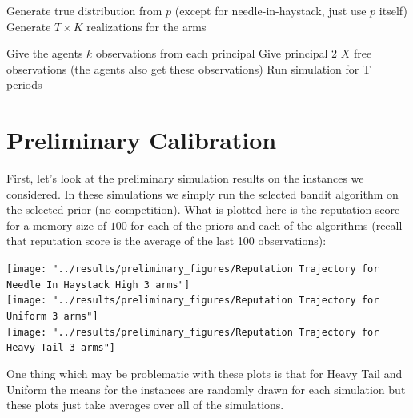 \documentclass[11pt,letterpaper]{article}
\begin{document}
\begin{algorithm}
\begin{algorithmic}[1]
\State Generate true distribution from $p$ (except for needle-in-haystack, just use $p$ itself)
\State Generate $T \times K$ realizations for the arms 
				
				\State Give the agents $k$ observations from each principal
				\State Give principal 2 $X$ free observations (the agents also get these observations)
				\State Run simulation for T periods
			\EndFor
		\EndFor
	\EndFor
\EndFor
\end{algorithmic}
\end{algorithm}

\section*{Preliminary Calibration}

First, let's look at the preliminary simulation results on the instances we considered. In these simulations we simply run the selected bandit algorithm on the selected prior (no competition).  What is plotted here is the reputation score for a memory size of $100$ for each of the priors and each of the algorithms (recall that reputation score is the average of the last 100 observations):

\texttt{[image: "../results/preliminary\_figures/Reputation Trajectory for Needle In Haystack High 3 arms"]} \\
\texttt{[image: "../results/preliminary\_figures/Reputation Trajectory for Uniform 3 arms"]} \\
\texttt{[image: "../results/preliminary\_figures/Reputation Trajectory for Heavy Tail 3 arms"]}

One thing which may be problematic with these plots is that for Heavy Tail and Uniform the means for the instances are randomly drawn for each simulation but these plots just take averages over all of the simulations.
\end{document}
